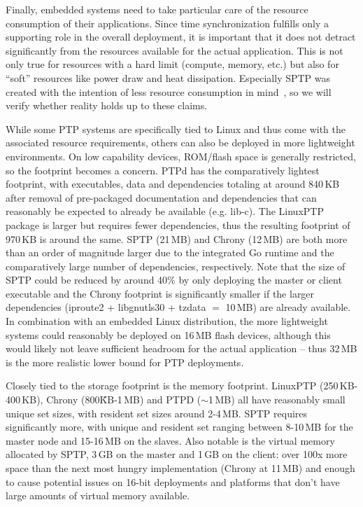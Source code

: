 Finally, embedded systems need to take particular care of the resource consumption of their applications. Since time synchronization fulfills only a supporting role in the overall deployment, it is important that it does not detract significantly from the resources available for the actual application. This is not only true for resources with a hard limit (compute, memory, etc.) but also for ``soft'' resources like power draw and heat dissipation. Especially SPTP was created with the intention of less resource consumption in mind~\cite{sptp}, so we will verify whether reality holds up to these claims.

While some PTP systems are specifically tied to Linux and thus come with the associated resource requirements, others can also be deployed in more lightweight environments. On low capability devices, ROM/flash space is generally restricted, so the footprint becomes a concern. PTPd has the comparatively lightest footprint, with executables, data and dependencies totaling at around 840\,KB after removal of pre-packaged documentation and dependencies that can reasonably be expected to already be available (e.g. lib-c). The LinuxPTP package is larger but requires fewer dependencies, thus the resulting footprint of 970\,KB is around the same. SPTP (21\,MB) and Chrony (12\,MB) are both more than an order of magnitude larger due to the integrated Go runtime and the comparatively large number of dependencies, respectively. Note that the size of SPTP could be reduced by around 40\% by only deploying the master or client executable and the Chrony footprint is significantly smaller if the larger dependencies (iproute2 + libgnutls30 + tzdata $=$ 10\,MB) are already available. In combination with an embedded Linux distribution, the more lightweight systems could reasonably be deployed on 16\,MB flash devices, although this would likely not leave sufficient headroom for the actual application -- thus 32\,MB is the more realistic lower bound for PTP deployments.

Closely tied to the storage footprint is the memory footprint. LinuxPTP (250\,KB-400\,KB), Chrony (800\~KB-1\,MB) and PTPD ($\sim$1\,MB) all have reasonably small unique set sizes, with resident set sizes around 2-4\,MB. SPTP requires significantly more, with unique and resident set ranging between 8-10\,MB for the master node and 15-16\,MB on the slaves. Also notable is the virtual memory allocated by SPTP, 3\,GB on the master and 1\,GB on the client: over 100x more space than the next most hungry implementation (Chrony at 11\,MB) and enough to cause potential issues on 16-bit deployments and platforms that don't have large amounts of virtual memory available.

